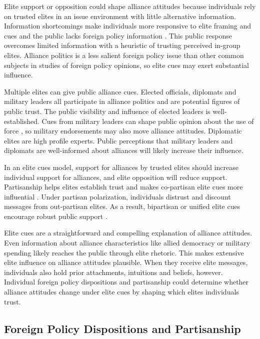 \documentclass[12pt]{article}
\begin{document}
Elite support or opposition could shape alliance attitudes because individuals rely on trusted elites in an issue environment with little alternative information. 
Information shortcomings make individuals more responsive to elite framing and cues \citep{Druckman2001, Peterson2017} and the public lacks foreign policy information \citep{BaumPotter2008}.
This public response overcomes limited information with a heuristic of trusting perceived in-group elites. 
Alliance politics is a less salient foreign policy issue than other common subjects in studies of foreign policy opinions, so elite cues may exert substantial influence.


Multiple elites can give public alliance cues.
Elected officials, diplomats and military leaders all participate in alliance politics and are potential figures of public trust.
The public visibility and influence of elected leaders is well-established.
Cues from military leaders can shape public opinion about the use of force \citep{Golbyetal2018}, so military endorsements may also move alliance attitudes. 
Diplomatic elites are high profile experts. 
Public perceptions that military leaders and diplomats are well-informed about alliances will likely increase their influence. 


In an elite cues model, support for alliances by trusted elites should increase individual support for alliances, and elite opposition will reduce support.   
Partisanship helps elites establish trust and makes co-partisan elite cues more influential \citep{Druckmanetal2013}.
Under partisan polarization, individuals distrust and discount messages from out-partisan elites.
As a result, bipartisan or unified elite cues encourage robust public support \citep{Berinsky2007}.


Elite cues are a straightforward and compelling explanation of alliance attitudes.
Even information about alliance characteristics like allied democracy or military spending likely reaches the public through elite rhetoric. 
This makes extensive elite influence on alliance attitudes plausible. 
When they receive elite messages, individuals also hold prior attachments, intuitions and beliefs, however.
Individual foreign policy dispositions and partisanship could determine whether alliance attitudes change under elite cues by shaping which elites individuals trust.


\subsection{Foreign Policy Dispositions and Partisanship}
\end{document}
